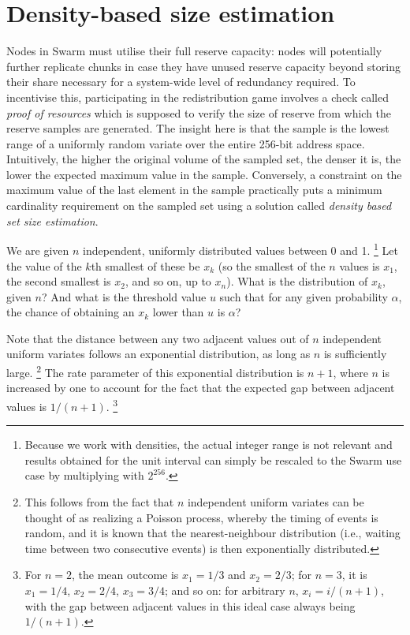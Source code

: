 \section{Density-based size estimation}\label{sec:density}

Nodes in Swarm must utilise their full reserve capacity: nodes will potentially further replicate chunks in case they have unused reserve capacity beyond storing their share necessary for a system-wide level of redundancy required. To incentivise this, participating in the redistribution game involves a check called \emph{proof of resources} which is supposed to verify the size of reserve from which the reserve samples are generated.
The insight here is that the sample is the lowest range of a uniformly random variate over the entire 256-bit address space. Intuitively, the higher the original volume of the sampled set, the denser it is, the lower the expected maximum value in the sample.
Conversely, a constraint on the maximum value of the last element in the sample practically puts a minimum cardinality requirement on the sampled set using a solution called \emph{density based set size estimation}.

We are given $n$ independent, uniformly distributed values between 0
and 1.%
%
\footnote{Because we work with densities, the actual integer range is not relevant and results obtained for the unit interval can simply be rescaled to the Swarm use case by multiplying with $2^{256}$.}
%
Let the value of the $k$th smallest of these be $x_k$ (so the
smallest of the $n$ values is $x_1$, the second smallest is $x_2$,
and so on, up to $x_n$). What is the distribution of $x_k$, given
$n$? And what is the threshold value $u$ such that for any given
probability $\alpha$, the chance of obtaining an $x_k$ lower than
$u$ is $\alpha$?

Note that the distance between any two adjacent
values out of $n$ independent uniform variates follows an exponential
distribution, as long as $n$ is sufficiently large.%
%
\footnote{This follows from
the fact that $n$ independent uniform variates can be thought of as realizing a Poisson process, whereby the timing of events is random, and
it is known that the nearest-neighbour distribution (i.e., waiting time
between two consecutive events) is then exponentially distributed.}
%
The rate parameter of this exponential distribution is $n+1$, where $n$
is increased by one to account for the fact that the expected gap
between adjacent values is $1/(n+1)$.%
%
\footnote{For $n=2$, the mean outcome
is $x_1 = 1/3$ and $x_2 = 2/3$; for $n = 3$, it is $x_1 = 1/4$,
$x_2 = 2/4$, $x_3 = 3/4$; and so on: for arbitrary $n$,
$x_i = i / (n+1)$, with the gap between adjacent values in this ideal
case always being $1/(n+1)$.}

